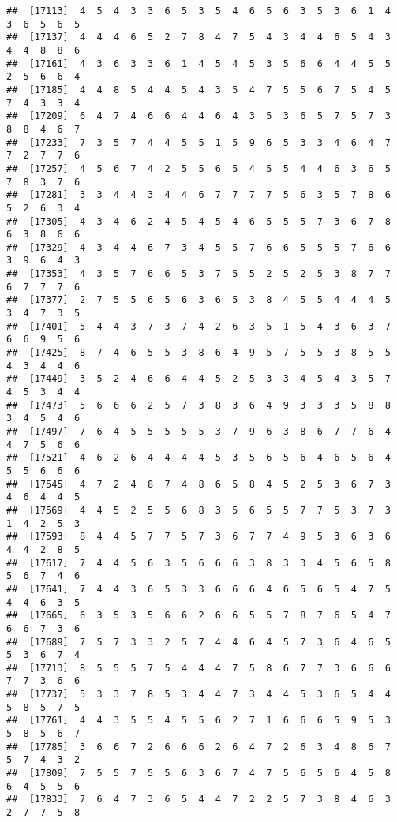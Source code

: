 \documentclass[
]{book}
\begin{document}
\begin{verbatim}
##  [17113]  4  5  4  3  3  6  5  3  5  4  6  5  6  3  5  3  6  1  4  3  6  5  6  5
##  [17137]  4  4  4  6  5  2  7  8  4  7  5  4  3  4  4  6  5  4  3  4  4  8  8  6
##  [17161]  4  3  6  3  3  6  1  4  5  4  5  3  5  6  6  4  4  5  5  2  5  6  6  4
##  [17185]  4  4  8  5  4  4  5  4  3  5  4  7  5  5  6  7  5  4  5  7  4  3  3  4
##  [17209]  6  4  7  4  6  6  4  4  6  4  3  5  3  6  5  7  5  7  3  8  8  4  6  7
##  [17233]  7  3  5  7  4  4  5  5  1  5  9  6  5  3  3  4  6  4  7  7  2  7  7  6
##  [17257]  4  5  6  7  4  2  5  5  6  5  4  5  5  4  4  6  3  6  5  7  8  3  7  6
##  [17281]  3  3  4  4  3  4  4  6  7  7  7  7  5  6  3  5  7  8  6  5  2  6  3  4
##  [17305]  4  3  4  6  2  4  5  4  5  4  6  5  5  5  7  3  6  7  8  6  3  8  6  6
##  [17329]  4  3  4  4  6  7  3  4  5  5  7  6  6  5  5  5  7  6  6  3  9  6  4  3
##  [17353]  4  3  5  7  6  6  5  3  7  5  5  2  5  2  5  3  8  7  7  6  7  7  7  6
##  [17377]  2  7  5  5  6  5  6  3  6  5  3  8  4  5  5  4  4  4  5  3  4  7  3  5
##  [17401]  5  4  4  3  7  3  7  4  2  6  3  5  1  5  4  3  6  3  7  6  6  9  5  6
##  [17425]  8  7  4  6  5  5  3  8  6  4  9  5  7  5  5  3  8  5  5  4  3  4  4  6
##  [17449]  3  5  2  4  6  6  4  4  5  2  5  3  3  4  5  4  3  5  7  4  5  3  4  4
##  [17473]  5  6  6  6  2  5  7  3  8  3  6  4  9  3  3  3  5  8  8  3  4  5  4  6
##  [17497]  7  6  4  5  5  5  5  5  3  7  9  6  3  8  6  7  7  6  4  4  7  5  6  6
##  [17521]  4  6  2  6  4  4  4  4  5  3  5  6  5  6  4  6  5  6  4  5  5  6  6  6
##  [17545]  4  7  2  4  8  7  4  8  6  5  8  4  5  2  5  3  6  7  3  4  6  4  4  5
##  [17569]  4  4  5  2  5  5  6  8  3  5  6  5  5  7  7  5  3  7  3  1  4  2  5  3
##  [17593]  8  4  4  5  7  7  5  7  3  6  7  7  4  9  5  3  6  3  6  4  4  2  8  5
##  [17617]  7  4  4  5  6  3  5  6  6  6  3  8  3  3  4  5  6  5  8  5  6  7  4  6
##  [17641]  7  4  4  3  6  5  3  3  6  6  6  4  6  5  6  5  4  7  5  4  4  6  3  5
##  [17665]  6  3  5  3  5  6  6  2  6  6  5  5  7  8  7  6  5  4  7  6  6  7  3  6
##  [17689]  7  5  7  3  3  2  5  7  4  4  6  4  5  7  3  6  4  6  5  5  3  6  7  4
##  [17713]  8  5  5  5  7  5  4  4  4  7  5  8  6  7  7  3  6  6  6  7  7  3  6  6
##  [17737]  5  3  3  7  8  5  3  4  4  7  3  4  4  5  3  6  5  4  4  5  8  5  7  5
##  [17761]  4  4  3  5  5  4  5  5  6  2  7  1  6  6  6  5  9  5  3  5  8  5  6  7
##  [17785]  3  6  6  7  2  6  6  6  2  6  4  7  2  6  3  4  8  6  7  5  7  4  3  2
##  [17809]  7  5  5  7  5  5  6  3  6  7  4  7  5  6  5  6  4  5  8  6  4  5  5  6
##  [17833]  7  6  4  7  3  6  5  4  4  7  2  2  5  7  3  8  4  6  3  2  7  7  5  8

\end{verbatim}
\end{document}
